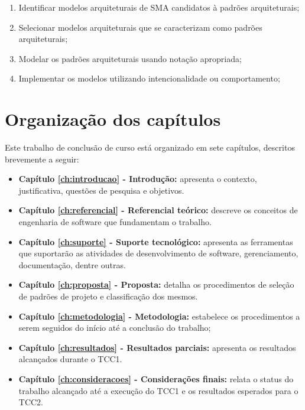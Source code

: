 \begin{enumerate}
    \item Identificar modelos arquiteturais de SMA candidatos à padrões arquiteturais;
    \item Selecionar modelos arquiteturais que se caracterizam como padrões arquiteturais; 
    \item Modelar os padrões arquiteturais usando notação apropriada;
    \item Implementar os modelos utilizando intencionalidade ou comportamento;
\end{enumerate}

\section{Organização dos capítulos}
    
Este trabalho de conclusão de curso está organizado em sete capítulos, descritos brevemente a seguir:

\begin{itemize}
    \item \textbf{Capítulo \ref{ch:introducao} - Introdução:} apresenta o contexto, justificativa, questões de pesquisa e objetivos.
    \item \textbf{Capítulo \ref{ch:referencial} - Referencial teórico:} descreve os conceitos de engenharia de software que fundamentam o trabalho.
    \item \textbf{Capítulo \ref{ch:suporte} - Suporte tecnológico:} apresenta as ferramentas que suportarão as atividades de desenvolvimento de software, gerenciamento, documentação, dentre outras.
    \item \textbf{Capítulo \ref{ch:proposta} - Proposta:} detalha os procedimentos de seleção de padrões de projeto e classificação dos mesmos.
    \item \textbf{Capítulo \ref{ch:metodologia} - Metodologia:} estabelece os procedimentos a serem seguidos do início até a conclusão do trabalho;
    \item \textbf{Capítulo \ref{ch:resultados} - Resultados parciais:} apresenta os resultados alcançados durante o TCC1.
    \item \textbf{Capítulo \ref{ch:consideracoes} - Considerações finais:} relata o status do trabalho alcançado até a execução do TCC1 e os resultados esperados para o TCC2.
\end{itemize}





